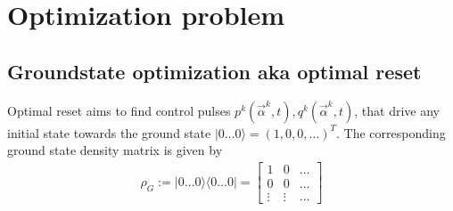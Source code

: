 \documentclass[letterpaper]{article}
\begin{document}
\section{Optimization problem}

\subsection{Groundstate optimization aka optimal reset}
Optimal reset aims to find control pulses $p^k(\vec{\alpha}^k, t), q^k(\vec{\alpha}^k, t)$,
that drive any initial state towards the ground state $|0\dots 0\rangle = (1, 0,
0, \dots )^T$. The corresponding ground state density matrix is given by
\begin{align}
  \rho_{G} := |0\dots 0\rangle \langle 0 \dots 0 | = 
  \begin{bmatrix} 1      & 0      &  \dots   \\ 
                  0      & 0      &  \dots  \\ 
                  \vdots & \vdots &  \dots 
  \end{bmatrix}
\end{align}
\end{document}
